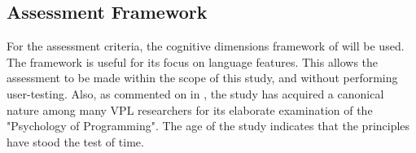 




\subsection{Assessment Framework}
For the assessment criteria, the cognitive dimensions framework of \cite[]{green_usability_1996} will be used. 
The framework is useful for its focus on language features. 
This allows the assessment to be made within the scope of this study, and without performing user-testing.
Also, as commented on in , the study has acquired a canonical nature among many VPL researchers for its elaborate examination of the "Psychology of Programming".
The age of the study indicates that the principles have stood the test of time. 

